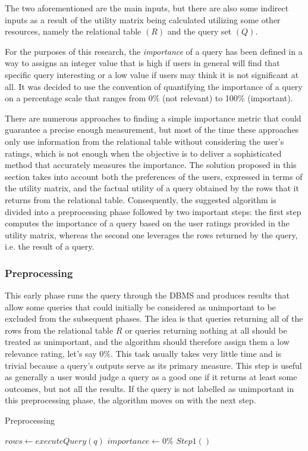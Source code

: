The two aforementioned are the main inputs, but there are also some indirect inputs as a result of the utility matrix being calculated utilizing some other resources, namely the relational table $(R)$ and the query set $(Q)$. 

\begin{definition}[Importance]
For the purposes of this research, the \emph{importance} of a query has been defined in a way to assigns an integer value that is high if users in general will find that specific query interesting or a low value if users may think it is not significant at all. It was decided to use the convention of quantifying the importance of a query on a percentage scale that ranges from 0\% (not relevant) to 100\% (important).
\end{definition}


There are numerous approaches to finding a simple importance metric that could guarantee a precise enough measurement, but most of the time these approaches only use information from the relational table without considering the user's ratings, which is not enough when the objective is to deliver a sophisticated method that accurately measures the importance. The solution proposed in this section takes into account both the preferences of the users, expressed in terms of the utility matrix, and the factual utility of a query obtained by the rows that it returns from the relational table. Consequently, the suggested algorithm is divided into a preprocessing phase followed by two important steps: the first step computes the importance of a query based on the user ratings provided in the utility matrix, whereas the second one leverages the rows returned by the query, i.e. the result of a query.

\subsubsection{Preprocessing}
This early phase runs the query through the DBMS and produces results that allow some queries that could initially be considered as unimportant to be excluded from the subsequent phases. The idea is that queries returning all of the rows from the relational table $R$ or queries returning nothing at all should be treated as unimportant, and the algorithm should therefore assign them a low relevance rating, let's say $0\%$. This task usually takes very little time and is trivial because a query's outputs serve as its primary measure. 
This step is useful as generally a user would judge a query as a good one if it returns at least some outcomes, but not all the results. If the query is not labelled as unimportant in this preprocessing phase, the algorithm moves on with the next step.
\begin{algorithm}[h]
    \caption{Preprocessing} 
    \begin{algorithmic}[1]
        \State $rows \gets executeQuery(q)$
            \State $importance \gets 0\%$
        \Else
            \State $Step1()$
        \EndIf
    \end{algorithmic} 
    \label{alg:PartB_Preprocessing}
\end{algorithm}


